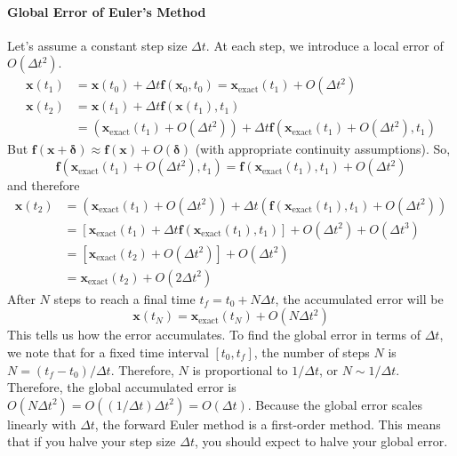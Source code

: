 \paragraph*{Global Error of Euler's Method} Let's assume a constant step size $\Delta t$. At each step, we introduce a local error of $O(\Delta t^2)$.
\begin{align}
    \mathbf{x}(t_1) &= \mathbf{x}(t_0) + \Delta t \mathbf{f}(\mathbf{x}_0, t_0) = \mathbf{x}_{\text{exact}}(t_1) + O(\Delta t^2) \\
    \mathbf{x}(t_2) &= \mathbf{x}(t_1) + \Delta t \mathbf{f}(\mathbf{x}(t_1), t_1) \nonumber \\
    &= (\mathbf{x}_{\text{exact}}(t_1) + O(\Delta t^2)) + \Delta t \mathbf{f}(\mathbf{x}_{\text{exact}}(t_1) + O(\Delta t^2), t_1)
\end{align}
But $\mathbf{f}(\mathbf{x} + \boldsymbol{\delta}) \approx \mathbf{f}(\mathbf{x}) + O(\boldsymbol{\delta})$ (with appropriate continuity assumptions). So,
\begin{equation}
\mathbf{f}(\mathbf{x}_{\text{exact}}(t_1) + O(\Delta t^2), t_1) = \mathbf{f}(\mathbf{x}_{\text{exact}}(t_1), t_1) + O(\Delta t^2)
\end{equation}
and therefore
\begin{align}
    \mathbf{x}(t_2) &= (\mathbf{x}_{\text{exact}}(t_1) + O(\Delta t^2)) + \Delta t (\mathbf{f}(\mathbf{x}_{\text{exact}}(t_1), t_1) + O(\Delta t^2)) \nonumber \\
    &= \left[ \mathbf{x}_{\text{exact}}(t_1) + \Delta t \mathbf{f}(\mathbf{x}_{\text{exact}}(t_1), t_1) \right] + O(\Delta t^2) + O(\Delta t^3) \nonumber \\
    &= \left[ \mathbf{x}_{\text{exact}}(t_2) + O(\Delta t^2) \right] + O(\Delta t^2) \nonumber \\
    &= \mathbf{x}_{\text{exact}}(t_2) + O(2\Delta t^2)
\end{align}
After $N$ steps to reach a final time $t_f = t_0 + N\Delta t$, the accumulated error will be
\begin{equation}
    \mathbf{x}(t_N) = \mathbf{x}_{\text{exact}}(t_N) + O(N\Delta t^2)
\end{equation}
This tells us how the error accumulates. To find the global error in terms of $\Delta t$, we note that for a fixed time interval $[t_0, t_f]$, the number of steps $N$ is $N = (t_f - t_0) / \Delta t$. Therefore, $N$ is proportional to $1/\Delta t$, or $N \sim 1/\Delta t$. Therefore, the global accumulated error is $O(N\Delta t^2) = O((1/\Delta t)\Delta t^2) = O(\Delta t)$. Because the global error scales linearly with $\Delta t$, the forward Euler method is a first-order method. This means that if you halve your step size $\Delta t$, you should expect to halve your global error.


